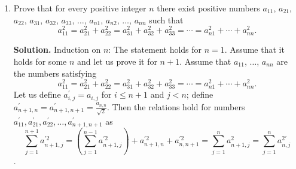 \begin{enumerate}
    
    \item  Prove that for every positive integer \( n \) there exist positive numbers \( a_{11} \),  \( a_{21} \), \( a_{22} \), \( a_{31} \), \( a_{32} \), \( a_{33} \), \( \dots \), \( a_{n1} \), \( a_{n2} \), \( \dots \), \( a_{nn} \) such that 
\[ a_{11}^2=a_{21}^2+a_{22}^2=a_{31}^2+a_{32}^2+a_{33}^2=\cdots=a_{n1}^2+\cdots+a_{nn}^2.\]
    
    
    \textbf{Solution.}  Induction on \( n \):
The statement holds for \( n=1 \). Assume that it holds for some \( n \) and let us prove it for \( n+1 \). 
Assume that \( a_{11} \), \( \dots \), \( a_{nn} \) are the numbers satisfying 
\[ a_{11}^2=a_{21}^2+a_{22}^2=a_{31}^2+a_{32}^2+a_{33}^2=\cdots=a_{n1}^2+\cdots+a_{nn}^2.\]
Let us define \( a_{i,j}^{\prime}=a_{i,j} \) for \( i\leq n+1 \) and \(j < n\); define
\( a^{\prime}_{n+1,n}=a^{\prime}_{n+1,n+1}=\frac{a_{n,n}}{\sqrt{2}} \). 
Then the relations hold for numbers \( a^{\prime}_{11}, a^{\prime}_{21},a^{\prime}_{22},\dots, a^{\prime}_{n+1,n+1} \) as \[ \sum^{n+1}_{j=1}{a^{\prime 2}_{n+1,j}} = \left(\sum^{n-1}_{j=1}{a^{\prime 2}_{n+1,j}} \right) + a^{\prime 2}_{n+1,n} + a^{\prime 2}_{n,n+1} = \sum^{n}_{j=1}{a^{2}_{n+1,j}} = \sum^{n}_{j=1}{a^{2\prime}_{n,j}} \].


    

\end{enumerate}


